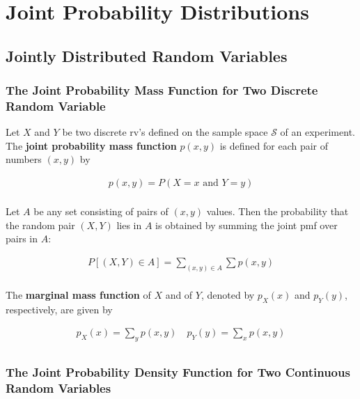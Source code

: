 \chapter{Joint Probability Distributions}

\section{Jointly Distributed Random Variables}

\subsection{The Joint Probability Mass Function for Two Discrete Random Variable}

\begin{definition}
    Let $X$ and $Y$ be two discrete rv's defined on the sample space $\mathcal{S}$ of an experiment. The \textbf{joint probability mass function} $p(x,y)$ is defined for each pair of numbers $(x,y)$ by

    \begin{align*}
        p(x,y) = P(X=x\text{ and }Y=y) \\
    \end{align*}

    Let $A$ be any set consisting of pairs of $(x,y)$ values. Then the probability that the random pair $(X,Y)$ lies in $A$ is obtained by summing the joint pmf over pairs in $A$:

    \begin{align*}
        P[(X,Y)\in A] = \sum_{(x,y)\in A}\sum p(x,y) \\
    \end{align*}
\end{definition}

\begin{definition}
    The \textbf{marginal mass function} of $X$ and of $Y$, denoted by $p_X(x)$ and $p_Y(y)$, respectively, are given by 

    \begin{align*}
        p_X(x) = \sum_y p(x,y) \quad p_Y(y) = \sum_x p(x,y) \\
    \end{align*}
\end{definition}

\subsection{The Joint Probability Density Function for Two Continuous Random Variables}

